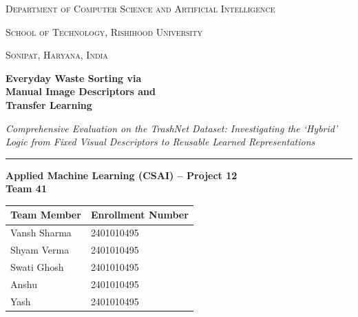 \documentclass[11pt,a4paper]{article}
\begin{document}
\begin{titlepage}
    \centering
    \vspace*{0.8cm}
    
    {\scshape\Large Department of Computer Science and Artificial Intelligence \par}
    \vspace{0.2cm}
    {\scshape\large School of Technology, Rishihood University \par}
    \vspace{0.2cm}
    {\scshape\normalsize Sonipat, Haryana, India \par}
    
    \vspace{2.2cm}
    
    {\huge\bfseries Everyday Waste Sorting via \\[0.3cm]
    Manual Image Descriptors and \\[0.3cm]
    Transfer Learning \par}
    
    \vspace{0.8cm}
    {\large\textit{Comprehensive Evaluation on the TrashNet Dataset: Investigating the `Hybrid' Logic from Fixed Visual Descriptors to Reusable Learned Representations} \par}
    
    \vspace{1.8cm}
    \rule{0.9\textwidth}{0.8pt}
    \vspace{1.0cm}
    
    {\large\bfseries Applied Machine Learning (CSAI) -- Project 12 \\[0.2cm]
    Team 41 \par}
    
    \vspace{1.0cm}
    
    \begin{table}[h!]
        \centering
        \begin{tabular}{ll}
            \toprule
            \textbf{Team Member} & \textbf{Enrollment Number} \\
            \midrule
            Vansh Sharma & 2401010495 \\
            Shyam Verma  & 2401010495 \\
            Swati Ghosh  & 2401010495 \\
            Anshu        & 2401010495 \\
            Yash         & 2401010495 \\
            \bottomrule
        \end{tabular}
    \end{table}
    

\end{titlepage}
\end{document}
